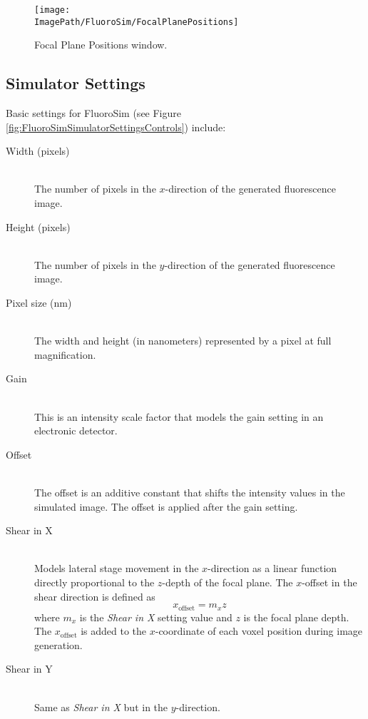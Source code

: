 \documentclass[11pt,titlepage,twoside]{article}
\begin{document}
\begin{figure}[hbp] %
   \centering
   \texttt{[image: \\ImagePath/FluoroSim/FocalPlanePositions]} 
   \caption{Focal Plane Positions window.}
   \label{fig:FocalPlanePositions}
\end{figure}

\subsection{Simulator Settings}

Basic settings for FluoroSim (see Figure \ref{fig:FluoroSimSimulatorSettingsControls}) include:

\begin{description}

\item[Width (pixels)] \hfill \\
The number of pixels in the $x$-direction of the generated fluorescence image.

\item[Height (pixels)] \hfill \\
The number of pixels in the $y$-direction of the generated fluorescence image.

\item[Pixel size (nm)] \hfill \\
The width and height (in nanometers) represented by a pixel at full magnification.

\item[Gain] \hfill \\
This is an intensity scale factor that models the gain setting in an electronic detector.

\item[Offset] \hfill \\
The offset is an additive constant that shifts the intensity values in the simulated image. The offset is applied after the gain setting.

\item[Shear in X] \hfill \\
Models lateral stage movement in the $x$-direction as a linear function directly proportional to the $z$-depth of the focal plane. The $x$-offset in the shear direction is defined as
\begin{equation}
x_{\mathrm{offset}} = m_{x} z
\end{equation}
where $m_{x}$ is the \emph{Shear in X} setting value and $z$ is the focal plane depth. The $x_{\mathrm{offset}}$ is added to the $x$-coordinate of each voxel position during image generation.

\item[Shear in Y] \hfill \\
Same as \emph{Shear in X} but in the $y$-direction.

\end{description}
\end{document}
